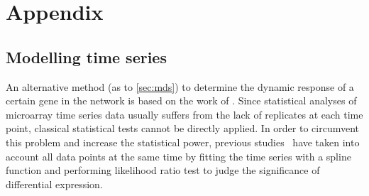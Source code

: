 \chapter{Appendix}

\section{Modelling time series}
\label{sec:full_reduced}
An alternative method (as to \ref{sec:mds}) to determine 
the dynamic response of a certain
gene in the network is based on the work of \cite{Mar2009}. 
Since statistical analyses of microarray time series data usually 
suffers from the lack
of replicates at each time point, classical statistical tests 
cannot be directly applied. In order to 
circumvent this problem and increase the statistical power,
previous studies~\citep{Bar-Joseph2003,Storey2005} have taken into 
account all data points at the
same time by fitting the time series with a spline function and 
performing likelihood ratio test to judge the significance of 
differential expression.

